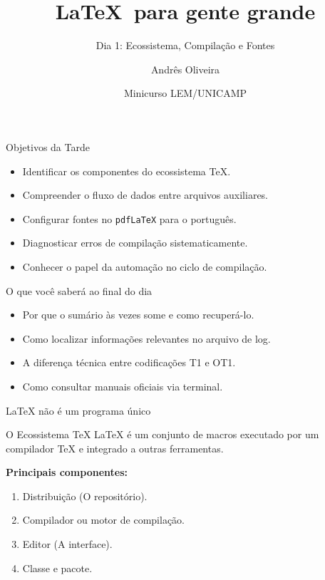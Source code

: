 \documentclass[handout]{beamer}
\title{\LaTeX\ para gente grande}
\subtitle{Dia 1: Ecossistema, Compilação e Fontes}
\author[Andrês Oliveira]{Andrês Oliveira}
\date{Minicurso LEM/UNICAMP}
\begin{document}
\begin{frame}
    \maketitle
\end{frame}

\begin{frame}{Objetivos da Tarde}
    \begin{itemize}
        \item Identificar os componentes do ecossistema TeX.
        \item Compreender o fluxo de dados entre arquivos auxiliares.
        \item Configurar fontes no \texttt{pdfLaTeX} para o português.
        \item Diagnosticar erros de compilação sistematicamente.
        \item Conhecer o papel da automação no ciclo de compilação.
    \end{itemize}
\end{frame}

\begin{frame}{O que você saberá ao final do dia}
    \begin{itemize}
        \item Por que o sumário às vezes some e como recuperá-lo.
        \item Como localizar informações relevantes no arquivo de log.
        \item A diferença técnica entre codificações T1 e OT1.
        \item Como consultar manuais oficiais via terminal.
    \end{itemize}
\end{frame}

\begin{frame}{LaTeX não é um programa único}
    \begin{block}{O Ecossistema TeX}
        LaTeX é um conjunto de macros executado por um compilador TeX e integrado a outras ferramentas.
    \end{block}
    \vfill
    \textbf{Principais componentes:}
    \begin{enumerate}
        \item Distribuição (O repositório).
        \item Compilador ou motor de compilação.
        \item Editor (A interface).
        \item Classe e pacote.
    \end{enumerate}
\end{frame}
\end{document}
